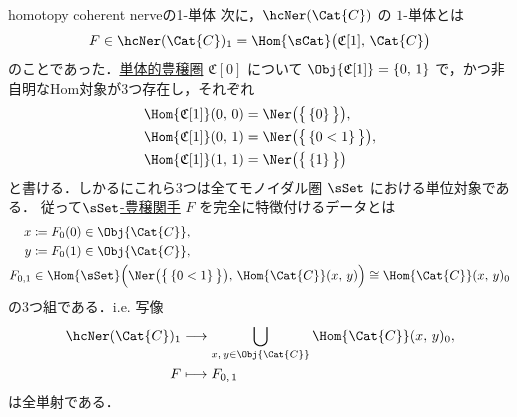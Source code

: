\documentclass[TQFT_main]{subfiles}
\begin{document}
\begin{myexample}[label=ex:hcNer-1]{homotopy coherent nerveの1-単体}
    次に，$\hcNer(\Cat{C})$ の $1$-単体とは
    \begin{align}
        F \in \hcNer(\Cat{C})_1 = \Hom{\sCat} \bigl( \mathfrak{C}[1],\, \Cat{C} \bigr)
    \end{align}
    のことであった．\hyperref[def:SimpCat]{単体的豊穣圏} $\mathfrak{C}[0]$ について
    $\Obj{\mathfrak{C}[1]} = \{0,\, 1\}$
    で，かつ非自明なHom対象が3つ存在し，それぞれ
    \begin{align}
        \Hom{\mathfrak{C}[1]} (0,\, 0) &= \Ner \bigl( \bigl\{\, \{0\} \,\bigr\} \bigr), \\
        \Hom{\mathfrak{C}[1]} (0,\, 1) &= \Ner \bigl( \bigl\{\, \{0 < 1\} \,\bigr\} \bigr), \\
        \Hom{\mathfrak{C}[1]} (1,\, 1) &= \Ner \bigl( \bigl\{\, \{1\} \,\bigr\} \bigr)
    \end{align}
    と書ける．しかるにこれら3つは全てモノイダル圏 $\sSet$ における単位対象である．
    従って\hyperref[def:enriched-functor]{$\sSet$-豊穣関手} $F$ を完全に特徴付けるデータとは
    \begin{align}
        x &\coloneqq F_0(0) \in \Obj{\Cat{C}}, \\
        y &\coloneqq F_0(1) \in \Obj{\Cat{C}}, \\
        F_{0,1} &\in \Hom{\sSet} \Bigl(\Ner \bigl( \bigl\{\, \{0 < 1\} \,\bigr\} \bigr),\, \Hom{\Cat{C}} (x,\, y) \Bigr) \cong \Hom{\Cat{C}}(x,\, y)_0
    \end{align}
    の3つ組である．i.e. 写像
    \begin{align}
        \hcNer(\Cat{C})_1 &\lto \bigcup_{x,\, y \in \Obj{\Cat{C}}} \Hom{\Cat{C}}(x,\, y)_0, \\
        F &\lmto F_{0,\, 1}
    \end{align}
    は全単射である．
    

\end{myexample}
\end{document}
